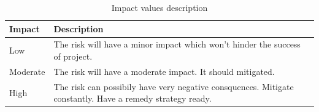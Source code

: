 \begin{table}[h]
\begin{tabular}{ | l | p{11.5cm} | }
  \hline
  \textbf{Impact} & \textbf{Description} \\
  \hline\noalign{\smallskip}\noalign{\smallskip}\hline
  Low       & The risk will have a minor impact which won't hinder the success of project. \\
  Moderate  & The risk will have a moderate impact. It should mitigated. \\
  High      & The risk can possibily have very negative consquences. Mitigate constantly. Have a remedy strategy ready. \\
  \hline
\end{tabular}
\caption{Impact values description}
\label{table:impact}
\end{table}


